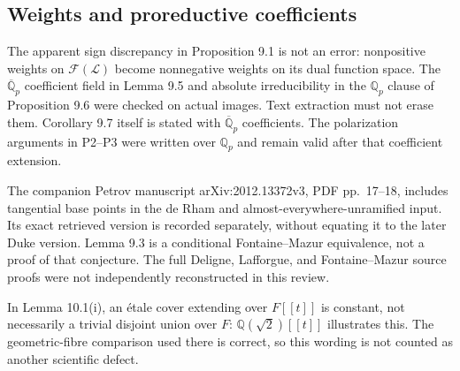\documentclass[10pt]{article}
\begin{document}
\subsection*{Weights and proreductive coefficients}
The apparent sign discrepancy in Proposition 9.1 is not an error: nonpositive weights on \(\mathcal F(\mathcal L)\) become nonnegative weights on its dual function space. The \(\overline{\mathbb Q}_p\) coefficient field in Lemma 9.5 and absolute irreducibility in the \(\mathbb Q_p\) clause of Proposition 9.6 were checked on actual images. Text extraction must not erase them. Corollary 9.7 itself is stated with \(\overline{\mathbb Q}_p\) coefficients. The polarization arguments in P2–P3 were written over \(\mathbb Q_p\) and remain valid after that coefficient extension.\par
The companion Petrov manuscript arXiv:2012.13372v3, PDF pp. 17–18, includes tangential base points in the de Rham and almost-everywhere-unramified input. Its exact retrieved version is recorded separately, without equating it to the later Duke version. Lemma 9.3 is a conditional Fontaine–Mazur equivalence, not a proof of that conjecture. The full Deligne, Lafforgue, and Fontaine–Mazur source proofs were not independently reconstructed in this review.\par
In Lemma 10.1(i), an étale cover extending over \(F[[t]]\) is constant, not necessarily a trivial disjoint union over \(F\): \(\mathbb Q(\sqrt2)[[t]]\) illustrates this. The geometric-fibre comparison used there is correct, so this wording is not counted as another scientific defect.\par
\end{document}
